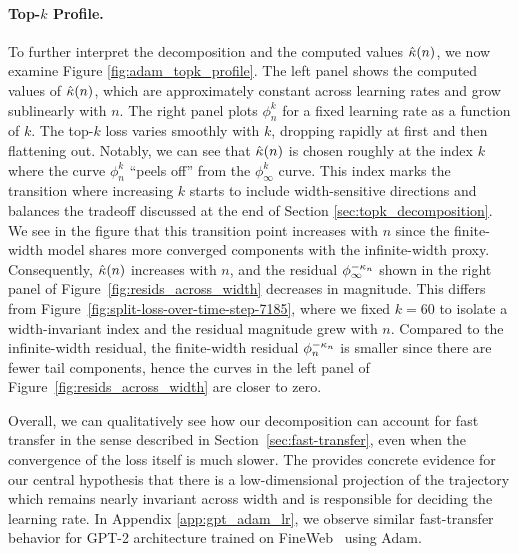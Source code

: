 \paragraph{Top-$k$ Profile.} To further interpret the decomposition and the computed values $\hat{\kappa}(n)$, we now examine Figure \ref{fig:adam_topk_profile}. The left panel shows the computed values of $\hat{\kappa}(n)$, which are approximately constant across learning rates and grow sublinearly with $n$. The right panel plots $\phi_n^k$ for a fixed learning rate as a function of $k$. The top-$k$ loss varies smoothly with $k$, dropping rapidly at first and then flattening out. Notably, we can see that $\hat{\kappa}(n)$ is chosen roughly at the index $k$ where the curve $\phi_n^k$ ``peels off'' from the $\phi_{\infty}^k$ curve. This index marks the transition where increasing $k$ starts to include width-sensitive directions and balances the tradeoff discussed at the end of Section \ref{sec:topk_decomposition}. We see in the figure that this transition point increases with $n$ since the finite-width model shares more converged components with the infinite-width proxy. Consequently, $\hat{\kappa}(n)$ increases with $n$, and the residual $\phi_\infty^{-\kappa_n}$ shown in the right panel of Figure~\ref{fig:resids_across_width} decreases in magnitude. This differs from Figure~\ref{fig:split-loss-over-time-step-7185}, where we fixed $k = 60$ to isolate a width-invariant index and the residual magnitude grew with $n$. Compared to the infinite-width residual, the finite-width residual $\phi_n^{-\kappa_n}$ is smaller since there are fewer tail components, hence the curves in the left panel of Figure~\ref{fig:resids_across_width} are closer to zero.


Overall, we can qualitatively see how our decomposition can account for fast transfer in the sense described in Section~\ref{sec:fast-transfer}, even when the convergence of the loss itself is much slower. The provides concrete evidence for our central hypothesis that there is a low-dimensional projection of the trajectory which remains nearly invariant across width and is responsible for deciding the learning rate. 
In Appendix \ref{app:gpt_adam_lr}, we observe similar fast-transfer behavior for GPT-2 architecture trained on FineWeb~\citep{penedo2024fineweb} using Adam. 

